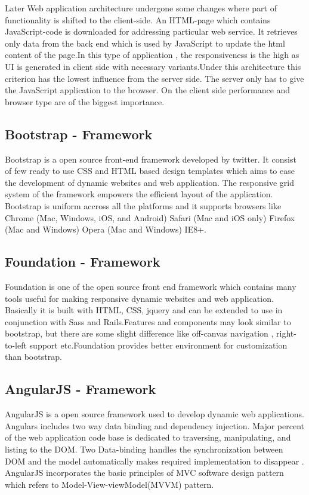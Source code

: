				 Later Web application architecture undergone some changes where part of functionality is shifted to the client-side. An HTML-page which contains JavaScript-code is downloaded for addressing particular web service. It retrieves only data from the back end which is used by JavaScript to update the html content of the page.In this type of application , the responsiveness is the high as UI is generated in client side with necessary variants.Under this architecture this criterion has the lowest influence from the server side. The server only has to give the JavaScript application to the browser. On the client side performance and browser type are of the biggest importance.
				

\subsection{Bootstrap - Framework}

                		Bootstrap is a open source front-end framework developed by twitter. It consist of few ready to use CSS  and HTML based design templates which aims to ease the development of dynamic websites and web application. The responsive grid system of the framework empowers the efficient layout of the application. Bootstrap is uniform accross all the platforms and it supports browsers like Chrome (Mac, Windows, iOS, and Android) Safari (Mac and iOS only) Firefox (Mac and Windows) Opera (Mac and Windows) IE8+.  				

\subsection{Foundation - Framework}

					Foundation is one of the open source front end framework which contains many tools useful for making responsive dynamic websites and web application. Basically it is built with HTML, CSS, jquery and can be extended to use in conjunction with Sass and Rails.Features and components may look similar to bootstrap, but there are some slight difference like off-canvas navigation , right-to-left support etc.Foundation provides better environment for customization than bootstrap.   
				

\subsection{AngularJS - Framework}			
					AngularJS is a open source framework used to develop dynamic web applications. Angulars includes two way data binding and dependency injection. Major percent of the web application code base is dedicated to traversing, manipulating, and listing to the DOM. Two Data-binding handles the synchronization between DOM and the model automatically makes required implementation to disappear . AngularJS incorporates the basic principles of MVC software design pattern which refers to Model-View-viewModel(MVVM) pattern.
					
